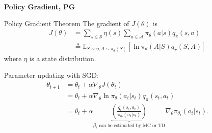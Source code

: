 \begin{frame}
    \textbf{Policy Gradient, PG}
    \begin{block}{Policy Gradient Theorem}
        The gradient of $J(\theta)$ is 
        \begin{align*}
            J(\theta) &= 
        \sum_{s\in \mathcal{S}}\eta(s)\sum_{a \in \mathcal{A}}\pi_\theta(a|s)q_\pi(s,a)\\
        &\triangleq \mathbb{E}_{S\sim\eta,A\sim\pi_\theta(S)}\left[
            \ln \pi_\theta(A|S)q_\pi(S,A)
        \right]
        \end{align*}
        where $\eta$ is a state distribution.
    \end{block}

    Parameter updating with SGD:
    \begin{align*}
        \theta_{t+1} &= \theta_t + \alpha \nabla_\theta J(\theta_t) \\
        &=\theta_t + \alpha \nabla_{\theta} \ln \pi_\theta(a_t|s_t)q_\pi(s_t,a_t) \\
        &=\theta_t + \alpha \underbrace{\left(
            \frac{q_t(s_t, a_t)}{\pi_{\theta_t}(a_t|s_t)}
        \right)}_{\beta_t \text{ can be estimated by MC or TD}}
        \nabla_\theta \pi_{\theta_t}(a_t|s_t).
    \end{align*}
\end{frame}
